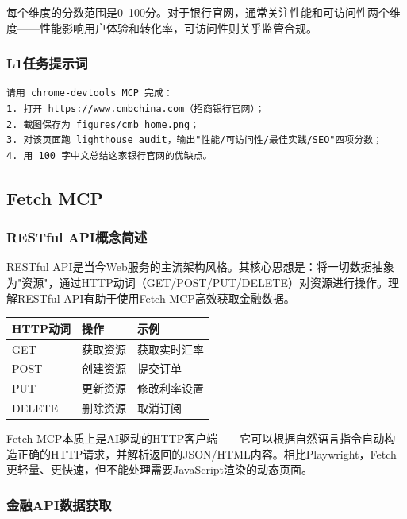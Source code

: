 每个维度的分数范围是0--100分。对于银行官网，通常关注性能和可访问性两个维度——性能影响用户体验和转化率，可访问性则关乎监管合规。

\subsubsection{L1任务提示词}

\begin{lstlisting}
请用 chrome-devtools MCP 完成：
1. 打开 https://www.cmbchina.com（招商银行官网）；
2. 截图保存为 figures/cmb_home.png；
3. 对该页面跑 lighthouse_audit，输出"性能/可访问性/最佳实践/SEO"四项分数；
4. 用 100 字中文总结这家银行官网的优缺点。
\end{lstlisting}

\subsection{Fetch MCP}

\subsubsection{RESTful API概念简述}

RESTful API是当今Web服务的主流架构风格。其核心思想是：将一切数据抽象为"资源"，通过HTTP动词（GET/POST/PUT/DELETE）对资源进行操作。理解RESTful API有助于使用Fetch MCP高效获取金融数据。

\begin{table}[H]
\centering
\begin{tabular}{lll}
\toprule
\textbf{HTTP动词} & \textbf{操作} & \textbf{示例} \\
\midrule
GET & 获取资源 & 获取实时汇率 \\
POST & 创建资源 & 提交订单 \\
PUT & 更新资源 & 修改利率设置 \\
DELETE & 删除资源 & 取消订阅 \\
\bottomrule
\end{tabular}
\end{table}

Fetch MCP本质上是AI驱动的HTTP客户端——它可以根据自然语言指令自动构造正确的HTTP请求，并解析返回的JSON/HTML内容。相比Playwright，Fetch更轻量、更快速，但不能处理需要JavaScript渲染的动态页面。

\subsubsection{金融API数据获取}

